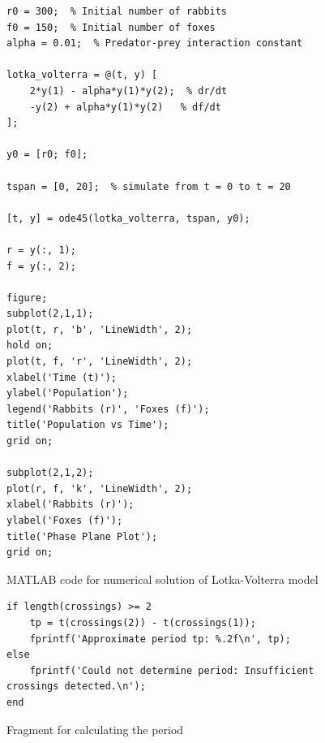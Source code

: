 \documentclass[a4paper, oneside]{article}
\begin{document}
\begin{figure}[h!]
    \begin{verbatim}
r0 = 300;  % Initial number of rabbits
f0 = 150;  % Initial number of foxes
alpha = 0.01;  % Predator-prey interaction constant

lotka_volterra = @(t, y) [
    2*y(1) - alpha*y(1)*y(2);  % dr/dt
    -y(2) + alpha*y(1)*y(2)   % df/dt
];

y0 = [r0; f0];

tspan = [0, 20];  % simulate from t = 0 to t = 20

[t, y] = ode45(lotka_volterra, tspan, y0);

r = y(:, 1);
f = y(:, 2);

figure;
subplot(2,1,1);
plot(t, r, 'b', 'LineWidth', 2);
hold on;
plot(t, f, 'r', 'LineWidth', 2); 
xlabel('Time (t)');
ylabel('Population');
legend('Rabbits (r)', 'Foxes (f)');
title('Population vs Time');
grid on;

subplot(2,1,2);
plot(r, f, 'k', 'LineWidth', 2);
xlabel('Rabbits (r)');
ylabel('Foxes (f)');
title('Phase Plane Plot');
grid on;
    \end{verbatim}
    \caption{MATLAB code for numerical solution of Lotka-Volterra model}
    \label{fig:lotka-volterra}
\end{figure}

\begin{figure}[h!]
    \begin{verbatim}
if length(crossings) >= 2
    tp = t(crossings(2)) - t(crossings(1));
    fprintf('Approximate period tp: %.2f\n', tp);
else
    fprintf('Could not determine period: Insufficient crossings detected.\n');
end
    \end{verbatim}
    \caption{Fragment for calculating the period}
    \label{fig:period}
\end{figure}


\end{document}
